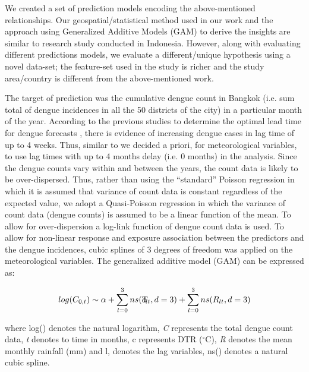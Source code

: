 \documentclass{bmcart}
\begin{document}
We created a set of prediction models encoding the above-mentioned relationships. Our geospatial/statistical method used in our work and the approach using Generalized Additive Models (GAM) to derive the insights are similar to research study \cite{ramadona2016prediction} conducted in Indonesia. However, along with evaluating different predictions models, we evaluate a different/unique hypothesis using a novel data-set; the feature-set used in the study is richer and the study area/country is different from the above-mentioned work. 

The target of prediction was the  cumulative dengue count in Bangkok (i.e. sum total of dengue incidences in all the 50 districts of the city) in a particular month of the year. According to the previous studies to determine the optimal lead time for dengue forecasts \cite{hii2012optimal}, there is evidence of increasing dengue cases in lag time of up to 4 weeks. Thus, similar to \cite{ramadona2016prediction} we decided a priori, for meteorological variables, to use lag times with up to 4 months delay (i.e. 0 months) in the analysis.  Since the dengue counts vary within and between the years, the count data is likely to be over-dispersed. Thus, rather than using the ``standard'' Poisson regression in which it is assumed that variance of count data is constant regardless of the expected value, we adopt a Quasi-Poisson regression in which the variance of count data (dengue counts) is assumed to be a linear function of the mean. To allow for over-dispersion a log-link function of dengue count data is used. To allow for non-linear response and exposure association between the predictors and the dengue incidences, cubic splines of 3 degrees of freedom was applied on the meteorological variables. The generalized additive model (GAM) can be expressed as:


\begin{equation}
\begin{aligned}
\label{eq:meteorological}
log (C_{0,t}) \sim \alpha +  \sum_{l=0}^{3} ns(\rlap{T}c _ {lt}, d =3) + \sum_{l=0}^{3} ns(R_ {lt}, d =3)
\end{aligned}
\end{equation}


where log() denotes the natural logarithm, \textit{C} represents the total dengue count data, \textit{t} denotes to time in months, c represents DTR ($^{\circ}$C), \textit{R} denotes the mean monthly rainfall (mm) and  l, denotes the lag variables, ns() denotes a natural cubic spline. \\
\end{document}
